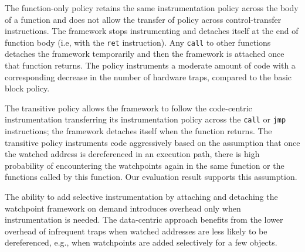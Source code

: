 The function-only policy retains the same instrumentation policy across the body of a function and does not allow the transfer of policy across control-transfer instructions. The framework stops instrumenting and detaches itself at the end of function body (i.e, with the \texttt{ret} instruction). Any \texttt{call} to other functions detaches the framework temporarily and then the framework is attached once that function returns. The policy instruments a moderate amount of code with a corresponding decrease in the number of hardware traps, compared to the basic block policy.%

The transitive policy allows the framework to follow the code-centric instrumentation transferring its instrumentation policy across the \texttt{call} or \texttt{jmp} instructions; the framework detaches itself when the function returns. The transitive policy instruments code aggressively based on the assumption that once the watched address is dereferenced in an execution path, there is high probability of encountering the watchpoints again in the same function or the functions called by this function. Our evaluation result supports this assumption.

The ability to add selective instrumentation by attaching and detaching the watchpoint framework on demand introduces overhead only when instrumentation is needed. The data-centric approach benefits from the lower overhead of infrequent traps when watched addresses are less likely to be dereferenced, e.g., when watchpoints are added selectively for a few objects.








